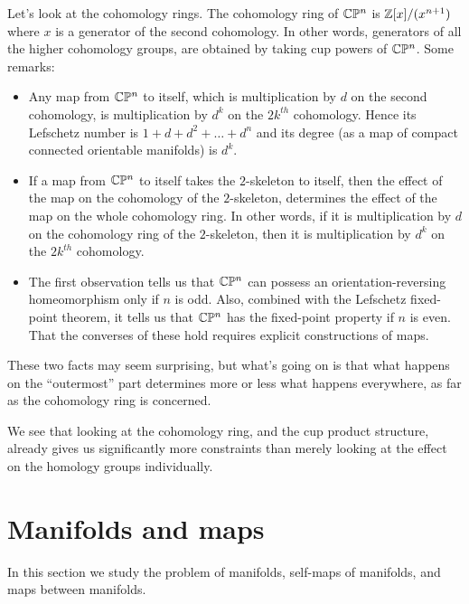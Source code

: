 \documentclass[a4paper]{amsart}
\begin{document}
Let's look at the cohomology rings. The cohomology ring of
$\mathbb{C}\mathbb{P}^n$ is $\mathbb{Z}[x]/(x^{n+1})$ where $x$ is a generator of the
second cohomology. In other words, generators of all the higher
cohomology groups, are obtained by taking cup powers of
$\mathbb{C}\mathbb{P}^n$. Some remarks:

\begin{itemize}

\item Any map from $\mathbb{C}\mathbb{P}^n$ to itself, which is multiplication
  by $d$ on the second cohomology, is multiplication by $d^k$ on the
  $2k^{th}$ cohomology. Hence its Lefschetz number is $1 + d + d^2 +
  \ldots + d^n$ and its degree (as a map of compact connected
  orientable manifolds) is $d^k$.

\item If a map from $\mathbb{C}\mathbb{P}^n$ to itself takes the $2$-skeleton
  to itself, then the effect of the map on the cohomology of the
  $2$-skeleton, determines the effect of the map on the whole
  cohomology ring. In other words, if it is multiplication by $d$ on
  the cohomology ring of the $2$-skeleton, then it is multiplication
  by $d^k$ on the $2k^{th}$ cohomology.

\item The first observation tells us that $\mathbb{C}\mathbb{P}^n$ can possess
  an orientation-reversing homeomorphism only if $n$ is odd. Also,
  combined with the Lefschetz fixed-point theorem, it tells us that
  $\mathbb{C}\mathbb{P}^n$ has the fixed-point property if $n$ is even. That
  the converses of these hold requires explicit constructions of maps.

\end{itemize}

These two facts may seem surprising, but what's going on is that what
happens on the ``outermost'' part determines more or less what happens
everywhere, as far as the cohomology ring is concerned.

We see that looking at the cohomology ring, and the cup product
structure, already gives us significantly more constraints than merely
looking at the effect on the homology groups individually.

\section{Manifolds and maps}

In this section we study the problem of manifolds, self-maps of
manifolds, and maps between manifolds. 
\end{document}

